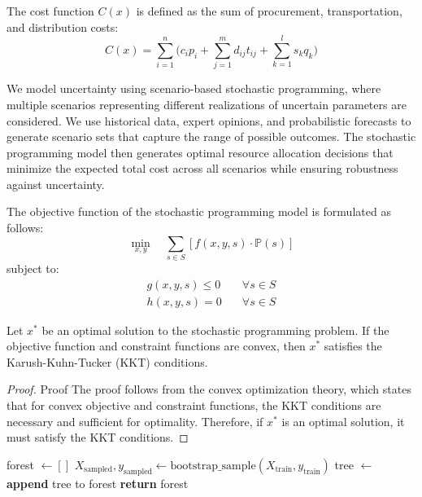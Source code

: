 \documentclass[trsc,dblanonrev]{informs4}
\begin{document}
The cost function $C(x)$ is defined as the sum of procurement, transportation, and distribution costs:
\begin{equation}
C(x) = \sum_{i=1}^{n} \Biggl(c_i p_i + \sum_{j=1}^{m} d_{ij} t_{ij} + \sum_{k=1}^{l} s_k q_k\Biggr)
\end{equation}

We model uncertainty using scenario-based stochastic programming, where multiple scenarios representing different realizations of uncertain parameters are considered. We use historical data, expert opinions, and probabilistic forecasts to generate scenario sets that capture the range of possible outcomes. The stochastic programming model then generates optimal resource allocation decisions that minimize the expected total cost across all scenarios while ensuring robustness against uncertainty.

The objective function of the stochastic programming model is formulated as follows:
\begin{equation*}
\min_{x,y} \quad \sum_{s \in S} \left[ f(x, y, s) \cdot \mathbb{P}(s) \right]
\end{equation*}
subject to:
\begin{align}
g(x, y, s) \leq 0 &\quad \forall s \in S\\
h(x, y, s) = 0 &\quad \forall s \in S
\end{align}

\begin{theorem}\label{thm:Opt}
Let $x^*$ be an optimal solution to the stochastic programming problem. If the objective function and constraint functions are convex, then $x^*$ satisfies the Karush-Kuhn-Tucker (KKT) conditions.
\end{theorem}

\begin{proof}{Proof}
The proof follows from the convex optimization theory, which states that for convex objective and constraint functions, the KKT conditions are necessary and sufficient for optimality. Therefore, if $x^*$ is an optimal solution, it must satisfy the KKT conditions.\Halmos
\end{proof}

\begin{algorithm}
\caption{Random Forest Training}
\vskip6pt
\begin{algorithmic}
    \State forest $\gets []$
        \State $X_{\text{sampled}}, y_{\text{sampled}} \gets \text{bootstrap\_sample}(X_{\text{train}}, y_{\text{train}})$
        \State tree $\gets$ 
        \State \textbf{append} tree to forest
    \EndFor
    \State \textbf{return} forest
\EndProcedure
\Statex
\end{algorithmic}
\end{algorithm}
\end{document}
